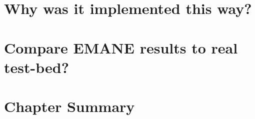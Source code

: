 


\section{Why was it implemented this way?}


\section{Compare EMANE results to real test-bed?}

\section{Chapter Summary}

